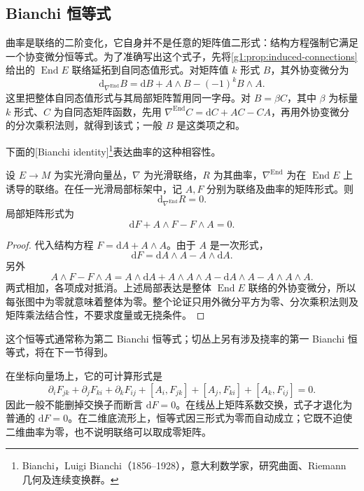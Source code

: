\subsection{Bianchi 恒等式}
\label{g1:subsec:1503:04}

曲率是联络的二阶变化，它自身并不是任意的矩阵值二形式：结构方程强制它满足一个协变微分恒等式。为了准确写出这个式子，先将\cref{g1:prop:induced-connections}给出的 \(\operatorname{End}E\) 联络延拓到自同态值形式。对矩阵值 \(k\) 形式 \(B\)，其外协变微分为
\begin{equation}\label{g1:eq:endomorphism-exterior-derivative}
	\mathrm{d}_{\nabla^{\operatorname{End}}}B
	=\mathrm{d}B+A\wedge B-(-1)^k B\wedge A.
\end{equation}
这里把整体自同态值形式与其局部矩阵暂用同一字母。对 \(B=\beta C\)，其中 \(\beta\) 为标量 \(k\) 形式、\(C\) 为自同态矩阵函数，先用 \(\nabla^{\operatorname{End}}C=\mathrm{d}C+AC-CA\)，再用外协变微分的分次乘积法则，就得到该式；一般 \(B\) 是这类项之和。

下面的[Bianchi identity]\footnote{Bianchi，Luigi Bianchi（1856--1928），意大利数学家，研究曲面、Riemann 几何及连续变换群。}表达曲率的这种相容性。

\begin{theorem}\label{g1:thm:bianchi-identity}
	设 \(E\to M\) 为实光滑向量丛，\(\nabla\) 为光滑联络，\(R\) 为其曲率，\(\nabla^{\operatorname{End}}\) 为在 \(\operatorname{End}E\) 上诱导的联络。在任一光滑局部标架中，记 \(A,F\) 分别为联络及曲率的矩阵形式。则
	\[
		\mathrm{d}_{\nabla^{\operatorname{End}}}R=0.
	\]
	局部矩阵形式为
	\begin{equation}\label{g1:eq:bianchi-matrix}
		\mathrm{d}F+A\wedge F-F\wedge A=0.
	\end{equation}
\end{theorem}
\begin{proof}
	代入结构方程 \(F=\mathrm{d}A+A\wedge A\)。由于 \(A\) 是一次形式，
	\[
		\mathrm{d}F=\mathrm{d}A\wedge A-A\wedge\mathrm{d}A.
	\]
	另外
	\[
		A\wedge F-F\wedge A
		=A\wedge\mathrm{d}A+A\wedge A\wedge A
		-\mathrm{d}A\wedge A-A\wedge A\wedge A.
	\]
	两式相加，各项成对抵消。上述局部表达是整体 \(\operatorname{End}E\) 联络的外协变微分，所以每张图中为零就意味着整体为零。整个论证只用外微分平方为零、分次乘积法则及矩阵乘法结合性，不要求度量或无挠条件。
\end{proof}

这个恒等式通常称为第二 Bianchi 恒等式；切丛上另有涉及挠率的第一 Bianchi 恒等式，将在下一节得到。

\ProseParagraphBreak

在坐标向量场上，它的可计算形式是
\[
	\partial_iF_{jk}+\partial_jF_{ki}+\partial_kF_{ij}
	+[A_i,F_{jk}]+[A_j,F_{ki}]+[A_k,F_{ij}]=0.
\]
因此一般不能删掉交换子而断言 \(\mathrm{d}F=0\)。在线丛上矩阵系数交换，式子才退化为普通的 \(\mathrm{d}F=0\)。在二维底流形上，恒等式因三形式为零而自动成立；它既不迫使二维曲率为零，也不说明联络可以取成零矩阵。

